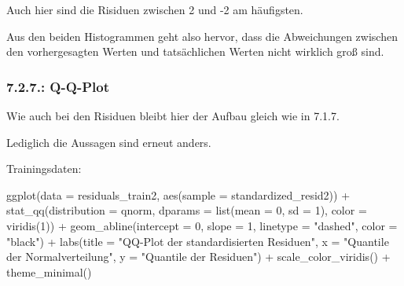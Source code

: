\documentclass[
  letterpaper,
  DIV=11,
  numbers=noendperiod]{scrartcl}
\newenvironment{Shaded}{\begin{snugshade}}{\end{snugshade}}
\newcommand{\AttributeTok}[1]{\textcolor[rgb]{0.40,0.45,0.13}{#1}}
\newcommand{\DecValTok}[1]{\textcolor[rgb]{0.68,0.00,0.00}{#1}}
\newcommand{\FunctionTok}[1]{\textcolor[rgb]{0.28,0.35,0.67}{#1}}
\newcommand{\NormalTok}[1]{\textcolor[rgb]{0.00,0.23,0.31}{#1}}
\newcommand{\SpecialCharTok}[1]{\textcolor[rgb]{0.37,0.37,0.37}{#1}}
\newcommand{\StringTok}[1]{\textcolor[rgb]{0.13,0.47,0.30}{#1}}
\begin{document}
Auch hier sind die Risiduen zwischen 2 und -2 am häufigsten.

Aus den beiden Histogrammen geht also hervor, dass die Abweichungen
zwischen den vorhergesagten Werten und tatsächlichen Werten nicht
wirklich groß sind.

\hypertarget{q-q-plot-1}{%
\subsubsection{7.2.7.: Q-Q-Plot}\label{q-q-plot-1}}

Wie auch bei den Risiduen bleibt hier der Aufbau gleich wie in 7.1.7.

Lediglich die Aussagen sind erneut anders.

Trainingsdaten:

\begin{Shaded}
\begin{Highlighting}[]
\FunctionTok{ggplot}\NormalTok{(}\AttributeTok{data =}\NormalTok{ residuals\_train2, }\FunctionTok{aes}\NormalTok{(}\AttributeTok{sample =}\NormalTok{ standardized\_resid2)) }\SpecialCharTok{+}
  \FunctionTok{stat\_qq}\NormalTok{(}\AttributeTok{distribution =}\NormalTok{ qnorm, }\AttributeTok{dparams =} \FunctionTok{list}\NormalTok{(}\AttributeTok{mean =} \DecValTok{0}\NormalTok{, }\AttributeTok{sd =} \DecValTok{1}\NormalTok{), }\AttributeTok{color =} \FunctionTok{viridis}\NormalTok{(}\DecValTok{1}\NormalTok{)) }\SpecialCharTok{+}
  \FunctionTok{geom\_abline}\NormalTok{(}\AttributeTok{intercept =} \DecValTok{0}\NormalTok{, }\AttributeTok{slope =} \DecValTok{1}\NormalTok{, }\AttributeTok{linetype =} \StringTok{"dashed"}\NormalTok{, }\AttributeTok{color =} \StringTok{"black"}\NormalTok{) }\SpecialCharTok{+}
  \FunctionTok{labs}\NormalTok{(}\AttributeTok{title =} \StringTok{"QQ{-}Plot der standardisierten Residuen"}\NormalTok{,}
       \AttributeTok{x =} \StringTok{"Quantile der Normalverteilung"}\NormalTok{,}
       \AttributeTok{y =} \StringTok{"Quantile der Residuen"}\NormalTok{) }\SpecialCharTok{+}
  \FunctionTok{scale\_color\_viridis}\NormalTok{() }\SpecialCharTok{+} 
  \FunctionTok{theme\_minimal}\NormalTok{()}
\end{Highlighting}
\end{Shaded}
\end{document}
